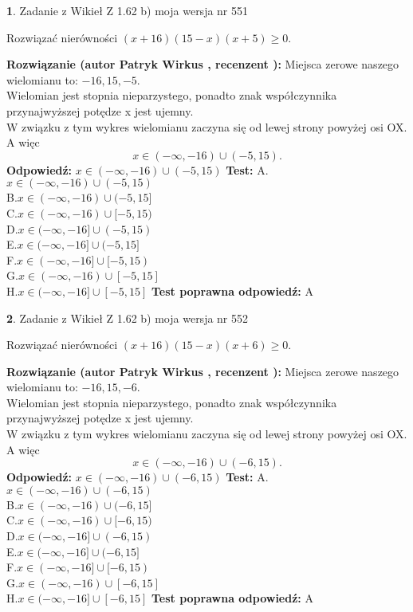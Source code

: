 \documentclass[12pt, a4paper]{article}
\theoremstyle{definition} %
\newtheorem{zad}{}
\newcommand{\zadStart}[1]{\begin{zad}#1\newline}
\newcommand{\zadStop}{\end{zad}}
\newcommand{\rozwStart}[2]{\noindent \textbf{Rozwiązanie (autor #1 , recenzent #2): }\newline}
\newcommand{\rozwStop}{\newline}
\newcommand{\odpStart}{\noindent \textbf{Odpowiedź:}\newline}
\newcommand{\odpStop}{\newline}
\newcommand{\testStart}{\noindent \textbf{Test:}\newline}
\newcommand{\testStop}{\newline}
\newcommand{\kluczStart}{\noindent \textbf{Test poprawna odpowiedź:}\newline}
\newcommand{\kluczStop}{\newline}
\begin{document}
\zadStart{Zadanie z Wikieł Z 1.62 b) moja wersja nr 551}

Rozwiązać nierówności $(x+16)(15-x)(x+5)\ge0$.
\zadStop
\rozwStart{Patryk Wirkus}{}
Miejsca zerowe naszego wielomianu to: $-16, 15, -5$.\\
Wielomian jest stopnia nieparzystego, ponadto znak współczynnika przy\linebreak najwyższej potędze x jest ujemny.\\ W związku z tym wykres wielomianu zaczyna się od lewej strony powyżej osi OX. A więc $$x \in (-\infty,-16) \cup (-5,15).$$
\rozwStop
\odpStart
$x \in (-\infty,-16) \cup (-5,15)$
\odpStop
\testStart
A.$x \in (-\infty,-16) \cup (-5,15)$\\
B.$x \in (-\infty,-16) \cup (-5,15]$\\
C.$x \in (-\infty,-16) \cup [-5,15)$\\
D.$x \in (-\infty,-16] \cup (-5,15)$\\
E.$x \in (-\infty,-16] \cup (-5,15]$\\
F.$x \in (-\infty,-16] \cup [-5,15)$\\
G.$x \in (-\infty,-16) \cup [-5,15]$\\
H.$x \in (-\infty,-16] \cup [-5,15]$
\testStop
\kluczStart
A
\kluczStop



\zadStart{Zadanie z Wikieł Z 1.62 b) moja wersja nr 552}

Rozwiązać nierówności $(x+16)(15-x)(x+6)\ge0$.
\zadStop
\rozwStart{Patryk Wirkus}{}
Miejsca zerowe naszego wielomianu to: $-16, 15, -6$.\\
Wielomian jest stopnia nieparzystego, ponadto znak współczynnika przy\linebreak najwyższej potędze x jest ujemny.\\ W związku z tym wykres wielomianu zaczyna się od lewej strony powyżej osi OX. A więc $$x \in (-\infty,-16) \cup (-6,15).$$
\rozwStop
\odpStart
$x \in (-\infty,-16) \cup (-6,15)$
\odpStop
\testStart
A.$x \in (-\infty,-16) \cup (-6,15)$\\
B.$x \in (-\infty,-16) \cup (-6,15]$\\
C.$x \in (-\infty,-16) \cup [-6,15)$\\
D.$x \in (-\infty,-16] \cup (-6,15)$\\
E.$x \in (-\infty,-16] \cup (-6,15]$\\
F.$x \in (-\infty,-16] \cup [-6,15)$\\
G.$x \in (-\infty,-16) \cup [-6,15]$\\
H.$x \in (-\infty,-16] \cup [-6,15]$
\testStop
\kluczStart
A
\kluczStop
\end{document}
